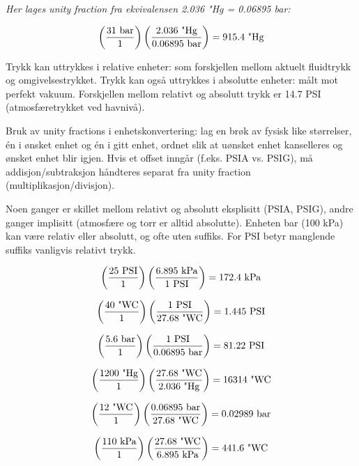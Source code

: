 \vskip 20pt

\noindent
{\it Her lages unity fraction fra ekvivalensen 2.036 "Hg = 0.06895 bar:}

$$\left(31 \hbox{ bar} \over 1 \right) \left(2.036 \hbox{ "Hg} \over 0.06895 \hbox{ bar}\right) = 915.4 \hbox{ "Hg} $$







Trykk kan uttrykkes i relative enheter: som forskjellen mellom aktuelt fluidtrykk og omgivelsestrykket. Trykk kan også uttrykkes i absolutte enheter: målt mot perfekt vakuum. Forskjellen mellom relativt og absolutt trykk er 14.7 PSI (atmosfæretrykket ved havnivå).

\vskip 10pt

Bruk av unity fractions i enhetskonvertering: lag en brøk av fysisk like størrelser, én i ønsket enhet og én i gitt enhet, ordnet slik at uønsket enhet kanselleres og ønsket enhet blir igjen. Hvis et offset inngår (f.eks. PSIA vs. PSIG), må addisjon/subtraksjon håndteres separat fra unity fraction (multiplikasjon/divisjon).

\vskip 10pt

Noen ganger er skillet mellom relativt og absolutt eksplisitt (PSIA, PSIG), andre ganger implisitt (atmosfære og torr er alltid absolutte). Enheten bar (100 kPa) kan være relativ eller absolutt, og ofte uten suffiks. For PSI betyr manglende suffiks vanligvis relativt trykk.






$$\left(25 \hbox{ PSI} \over 1 \right) \left(6.895 \hbox{ kPa} \over 1 \hbox{ PSI}\right) = 172.4 \hbox{ kPa} $$

$$\left(40 \hbox{ "WC} \over 1 \right) \left(1 \hbox{ PSI} \over 27.68 \hbox{ "WC}\right) = 1.445 \hbox{ PSI} $$

$$\left(5.6 \hbox{ bar} \over 1 \right) \left(1 \hbox{ PSI} \over 0.06895 \hbox{ bar}\right) = 81.22 \hbox{ PSI} $$

$$\left(1200 \hbox{ "Hg} \over 1 \right) \left(27.68 \hbox{ "WC} \over 2.036 \hbox{ "Hg}\right) = 16314 \hbox{ "WC} $$

$$\left(12 \hbox{ "WC} \over 1 \right) \left(0.06895 \hbox{ bar} \over 27.68 \hbox{ "WC}\right) = 0.02989 \hbox{ bar} $$

$$\left(110 \hbox{ kPa} \over 1 \right) \left(27.68 \hbox{ "WC} \over 6.895 \hbox{ kPa}\right) = 441.6 \hbox{ "WC} $$

